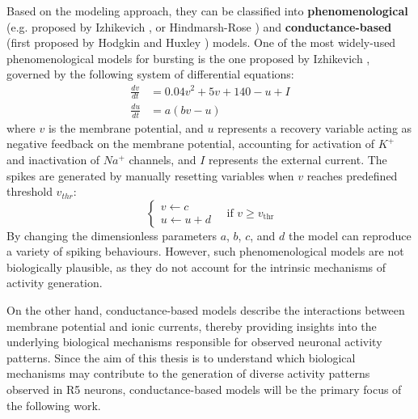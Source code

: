 \documentclass[../main.tex]{subfiles}
\begin{document}
Based on the modeling approach, they can be classified into \textbf{phenomenological} (e.g. proposed by Izhikevich \parencite{izhikevichSimpleModelSpiking2003,izhikevichNEURALEXCITABILITYSPIKING2000}, or Hindmarsh-Rose \parencite{wangGenesisBurstingOscillations1993}) and \textbf{conductance-based} (first proposed by Hodgkin and Huxley \parencite{hodgkinQuantitativeDescriptionMembrane1952}) models. One of the most widely-used phenomenological models for bursting is the one proposed by Izhikevich \parencite{izhikevichSimpleModelSpiking2003}, governed by the following system of differential equations:
\begin{align}
    \frac{dv}{dt}&=0.04 v^2 + 5v + 140 - u + I \label{eq:izhikevich_model_v} \\
    \frac{du}{dt}&=a(bv-u) \label{eq:izhikevich_model_u}
\end{align}
where $v$ is the membrane potential, and $u$ represents a recovery variable acting as negative feedback on the membrane potential, accounting for activation of $K^+$ and inactivation of $Na^+$ channels, and $I$ represents the external current. The spikes are generated by manually resetting variables when $v$ reaches predefined threshold $v_{thr}$:
\begin{equation*}
    \left\{
    \begin{array}{l}
    v \leftarrow c \\
    u \leftarrow u + d
    \end{array}
    \right.
    \quad \text{if } v \geq v_{\text{thr}}
\end{equation*}
By changing the dimensionless parameters $a$, $b$, $c$, and $d$ the model can reproduce a variety of spiking behaviours. However, such phenomenological models are not biologically plausible, as they do not account for the intrinsic mechanisms of activity generation.

On the other hand, conductance-based models describe the interactions between membrane potential and ionic currents, thereby providing insights into the underlying biological mechanisms responsible for observed neuronal activity patterns. Since the aim of this thesis is to understand which biological mechanisms may contribute to the generation of diverse activity patterns observed in R5 neurons, conductance-based models will be the primary focus of the following work.
\end{document}
